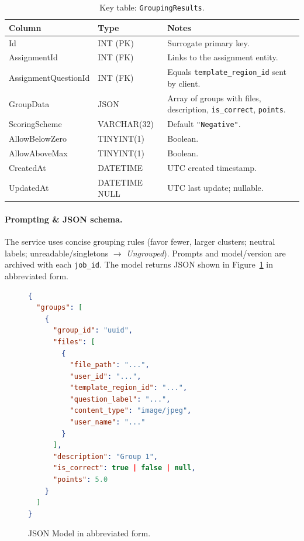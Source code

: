 \documentclass[ms,twoside,print]{nuthesis}
\begin{document}
\begin{table}[H]
  \centering
  \caption{Key table: \texttt{GroupingResults}.}
  \label{tab:groupingresults}
  \setlength\tabcolsep{6pt}
  \renewcommand{\arraystretch}{1.2}
  \footnotesize
  \begin{tabularx}{\textwidth}{@{}L{4.3cm}L{2.8cm}Y@{}}
    \toprule
    \textbf{Column} & \textbf{Type} & \textbf{Notes} \\
    \midrule
    Id & INT (PK) & Surrogate primary key. \\
    AssignmentId & INT (FK) & Links to the assignment entity. \\
    AssignmentQuestionId & INT (FK) & Equals \texttt{template\_region\_id} sent by client. \\
    GroupData & JSON & Array of groups with files, description, \texttt{is\_correct}, \texttt{points}. \\
    ScoringScheme & VARCHAR(32) & Default \texttt{"Negative"}. \\
    AllowBelowZero & TINYINT(1) & Boolean. \\
    AllowAboveMax & TINYINT(1) & Boolean. \\
    CreatedAt & DATETIME & UTC created timestamp. \\
    UpdatedAt & DATETIME NULL & UTC last update; nullable. \\
    \bottomrule
  \end{tabularx}
\end{table}

\paragraph{Prompting \& JSON schema.}
The service uses concise grouping rules (favor fewer, larger clusters; neutral labels; unreadable/singletons $\rightarrow$ \emph{Ungrouped}). Prompts and model/version are archived with each \texttt{job\_id}. The model returns JSON shown in Figure~\ref{fig:json_model} in abbreviated form.

\begin{figure}[htb]
\begin{lstlisting}[language=json]
{
  "groups": [
    {
      "group_id": "uuid",
      "files": [
        {
          "file_path": "...",
          "user_id": "...",
          "template_region_id": "...",
          "question_label": "...",
          "content_type": "image/jpeg",
          "user_name": "..."
        }
      ],
      "description": "Group 1",
      "is_correct": true | false | null,
      "points": 5.0
    }
  ]
}
\end{lstlisting}
\caption{JSON Model in abbreviated form.}
\label{fig:json_model}
\end{figure}
\end{document}
